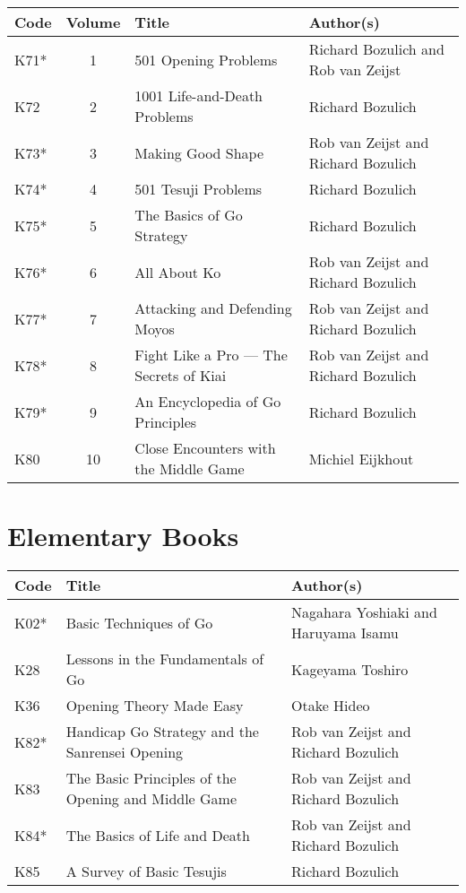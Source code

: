 \begin{longtable}{l|c|p{55mm}|p{35mm}} 
    \hline
    \textbf{Code} & \textbf{Volume} & \textbf{Title} & \textbf{Author(s)} \\
    \hline \hline
    K71* & 1 & 501 Opening Problems & Richard Bozulich and Rob van Zeijst \\
    \hline
    K72 & 2 & 1001 Life-and-Death Problems & Richard Bozulich \\
    \hline
    K73* & 3 & Making Good Shape & Rob van Zeijst and Richard Bozulich \\
    \hline
    K74* & 4 & 501 Tesuji Problems & Richard Bozulich \\
    \hline
    K75* & 5 & The Basics of Go Strategy & Richard Bozulich \\
    \hline
    K76* & 6 & All About Ko & Rob van Zeijst and Richard Bozulich \\
    \hline
    K77* & 7 & Attacking and Defending Moyos & Rob van Zeijst and Richard Bozulich \\
    \hline
    K78* & 8 & Fight Like a Pro --- The Secrets of Kiai & Rob van Zeijst and Richard Bozulich \\
    \hline
    K79* & 9 & An Encyclopedia of Go Principles & Richard Bozulich \\
    \hline
    K80 & 10 & Close Encounters with the Middle Game & Michiel Eijkhout \\
    \hline
\end{longtable}

\section{Elementary Books}

\begin{longtable}{l|p{55mm}|p{55mm}} 
    \hline
    \textbf{Code} & \textbf{Title} & \textbf{Author(s)} \\
    \hline \hline
    K02* & Basic Techniques of Go & Nagahara Yoshiaki and Haruyama Isamu \\
    \hline
    K28 & Lessons in the Fundamentals of Go & Kageyama Toshiro \\
    \hline
    K36 & Opening Theory Made Easy & Otake Hideo \\
    \hline
    K82* & Handicap Go Strategy and the Sanrensei Opening & Rob van Zeijst and Richard Bozulich \\
    \hline
    K83 & The Basic Principles of the Opening and Middle Game & Rob van Zeijst and Richard Bozulich \\
    \hline
    K84* & The Basics of Life and Death & Rob van Zeijst and Richard Bozulich \\
    \hline
    K85 & A Survey of Basic Tesujis & Richard Bozulich \\
    \hline
\end{longtable}

